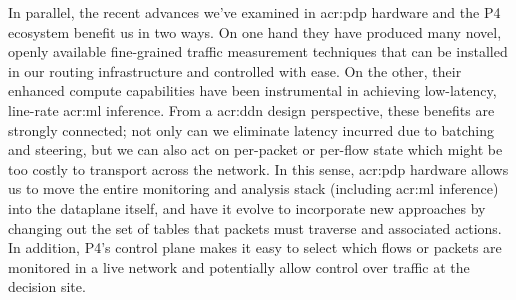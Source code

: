 
In parallel, the recent advances we've examined in \gls{acr:pdp} hardware and the P4 ecosystem benefit us in two ways.
On one hand they have produced many novel, openly available fine-grained traffic measurement techniques that can be installed in our routing infrastructure and controlled with ease.
On the other, their enhanced compute capabilities have been instrumental in achieving low-latency, line-rate \gls{acr:ml} inference.
From a \gls{acr:ddn} design perspective, these benefits are strongly connected; not only can we eliminate latency incurred due to batching and steering, but we can also act on per-packet or per-flow state which might be too costly to transport across the network.
In this sense, \gls{acr:pdp} hardware allows us to move the entire monitoring and analysis stack (including \gls{acr:ml} inference) into the dataplane itself, and have it evolve to incorporate new approaches by changing out the set of tables that packets must traverse and associated actions.
In addition, P4's control plane makes it easy to select which flows or packets are monitored in a live network and potentially allow control over traffic at the decision site.

